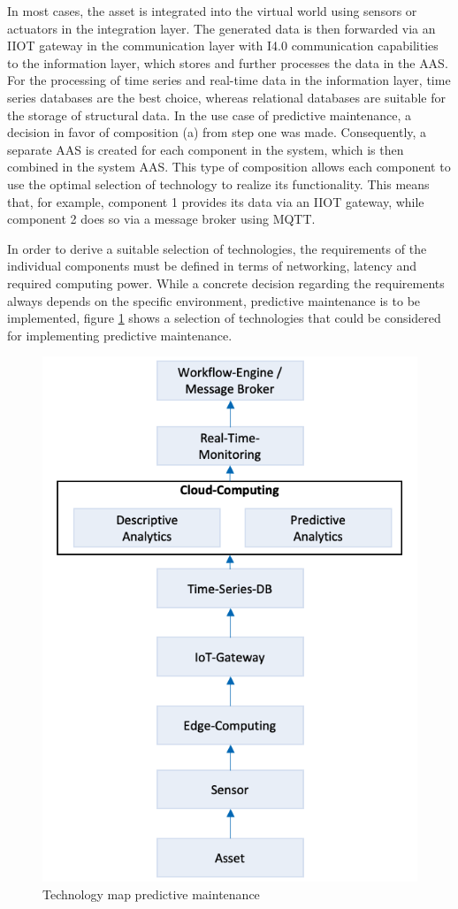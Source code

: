 In most cases, the asset is integrated into the virtual world using sensors or actuators in the integration layer. The generated data is then forwarded via an \ac{IIOT} gateway in the communication layer with \ac{I4.0} communication capabilities to the information layer, which stores and further processes the data in the \ac{AAS}. For the processing of time series and real-time data in the information layer, time series databases are the best choice, whereas relational databases are suitable for the storage of structural data. In the use case of predictive maintenance, a decision in favor of composition (a) from step one was made. Consequently, a separate \ac{AAS} is created for each component in the system, which is then combined in the system \ac{AAS}. This type of composition allows each component to use the optimal selection of technology to realize its functionality. This means that, for example, component 1 provides its data via an \ac{IIOT} gateway, while component 2 does so via a message broker using \ac{MQTT}. 

In order to derive a suitable selection of technologies, the requirements of the individual components must be defined in terms of networking, latency and required computing power. While a concrete decision regarding the requirements always depends on the specific environment, predictive maintenance is to be implemented, figure \ref{fig:technology-map-pred-maint} shows a selection of technologies that could be considered for implementing predictive maintenance. 

\begin{figure}[h]
\centering
\includegraphics[width=.5\textwidth]{content/pictures/tech_map_pred_maintenance.png}
\caption{Technology map predictive maintenance}
\label{fig:technology-map-pred-maint}
\end{figure}

